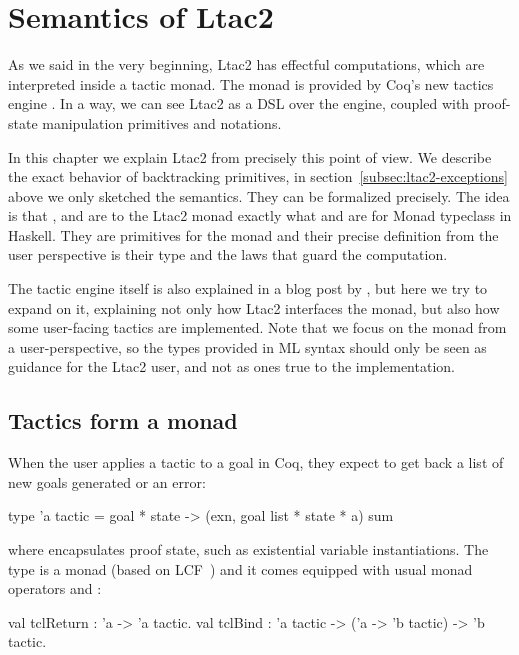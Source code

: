 \section{Semantics of Ltac2}
\label{sec:semantics-ltac2}

As we said in the very beginning, Ltac2 has effectful computations, which are interpreted inside a tactic monad.
The monad is provided by Coq's new tactics engine \cite{spiwackAbstractTypeConstructing2010}.
In a way, we can see Ltac2 as a DSL over the engine, coupled with proof-state manipulation primitives and notations.

In this chapter we explain Ltac2 from precisely this point of view.
We describe the exact behavior of backtracking primitives, in section~\ref{subsec:ltac2-exceptions} above we only sketched the semantics.
They can be formalized precisely.
The idea is that ,  and  are to the Ltac2 monad exactly what  and  are for Monad typeclass in Haskell.
They are primitives for the monad and their precise definition from the user perspective is their type and the laws that guard the computation.

The tactic engine itself is also explained in a blog post by \citet{pedrotCoqHoTTminuteTickingClockwork2016}, but here we try to expand on it, explaining not only how Ltac2 interfaces the monad, but also how some user-facing tactics are implemented.
Note that we focus on the monad from a user-perspective, so the types provided in ML syntax should only be seen as guidance for the Ltac2 user, and not as ones true to the implementation.

\subsection{Tactics form a monad}
\label{sec:monad-tactics}

When the user applies a tactic to a goal in Coq, they expect to get back a list of new goals generated or an error:
\begin{ocaml}
type 'a tactic = goal * state -> (exn, goal list * state * a) sum
\end{ocaml}
where  encapsulates proof state, such as existential variable instantiations.
The  type is a monad (based on LCF~\cite{gordonEdinburghLCFMechanised1979}) and it comes equipped with usual monad operators  and :
\begin{ocaml}
val tclReturn : 'a -> 'a tactic.
val tclBind : 'a tactic -> ('a -> 'b tactic) -> 'b tactic.
\end{ocaml}

